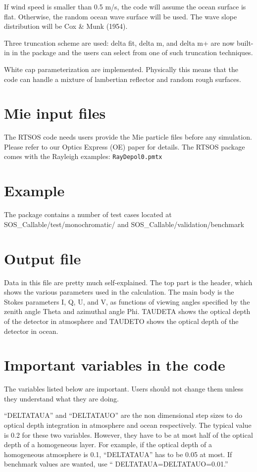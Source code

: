 \documentclass[10pt,letterpaper]{article}
\begin{document}
If wind speed is smaller than 0.5 m/s, the code will assume the ocean surface is flat.  Otherwise, the random ocean wave surface will be used.  The wave slope distribution will be Cox \& Munk (1954).

Three truncation scheme are used: delta fit, delta m, and delta m+ are now built-in in the package and the users can select from one of such truncation techniques.

White cap parameterization are implemented.  Physically this means that the code can handle a mixture of lambertian reflector and random rough surfaces.

\section{ Mie input files}
The RTSOS code needs users provide the Mie particle files before any simulation.  Please refer to our Optics Express (OE) paper for details.  The RTSOS package comes with the Rayleigh examples: \verb"RayDepol0.pmtx"


\section{Example}
The package contains a number of test cases located at
SOS\_Callable/test/monochromatic/
and 
SOS\_Callable/validation/benchmark

 
\section{Output file}
Data in this file are pretty much self-explained.  The top part is the header, which shows the various parameters used in the calculation.  The main body is the Stokes parameters I, Q, U, and V, as functions of viewing angles specified by the zenith angle Theta and azimuthal angle Phi.  TAUDETA shows the optical depth of the detector in atmosphere and TAUDETO shows the optical depth of the detector in ocean.

\section{Important variables in the code}
The variables listed below are important.  Users should not change them unless they understand what they are doing.

``DELTATAUA''  and ``DELTATAUO'' are the non dimensional step sizes to do optical depth integration in atmosphere and ocean respectively.  The typical value is 0.2 for these two variables.  However, they have to be at most half of the optical depth of a homogeneous layer.  For example, if the optical depth of a homogeneous atmosphere is 0.1, ``DELTATAUA'' has to be 0.05 at most.  If benchmark values are wanted, use `` DELTATAUA=DELTATAUO=0.01.''
\end{document}
